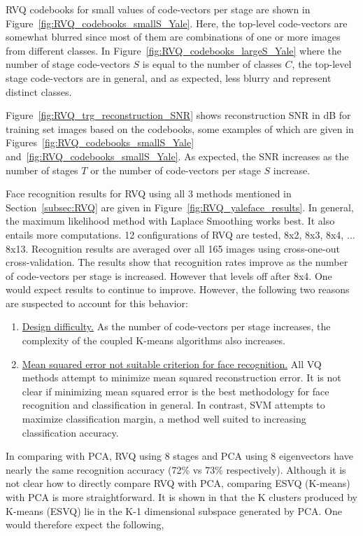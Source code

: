 RVQ codebooks for small values of code-vectors per stage are shown in Figure~\ref{fig:RVQ_codebooks_smallS_Yale}.  Here, the top-level code-vectors are somewhat blurred since most of them are combinations of one or more images from different classes.   In Figure~\ref{fig:RVQ_codebooks_largeS_Yale} where the number of stage code-vectors $S$ is equal to the number of classes $C$, the top-level stage code-vectors are in general, and as expected, less blurry and represent distinct classes.

Figure~\ref{fig:RVQ_trg_reconstruction_SNR} shows reconstruction SNR in dB for training set images based on the codebooks, some examples of which are given in Figures~\ref{fig:RVQ_codebooks_smallS_Yale} and~\ref{fig:RVQ_codebooks_smallS_Yale}.  As expected, the SNR increases as the number of stages $T$ or the number of code-vectors per stage $S$ increase.

Face recognition results for RVQ using all 3 methods mentioned in Section~\ref{subsec:RVQ} are given in Figure~\ref{fig:RVQ_yaleface_results}.  In general, the maximum likelihood method with Laplace Smoothing works best.  It also entails more computations.  12 configurations of RVQ are tested, 8x2, 8x3, 8x4, $\ldots$ 8x13.  Recognition results are averaged over all 165 images using cross-one-out cross-validation.  The results show that recognition rates improve as the number of code-vectors per stage is increased.  However that levels off after 8x4.  One would expect results to continue to improve.  However, the following two reasons are suspected to account for this behavior:

\begin{enumerate}
\item \underline{Design difficulty.}  As the number of code-vectors per stage increases, the complexity of the coupled K-means algorithms also increases.
\item \underline{Mean squared error not suitable criterion for face recognition.}  All VQ methods attempt to minimize mean squared reconstruction error.  It is not clear if minimizing mean squared error is the best methodology for face recognition and classification in general.  In contrast, SVM attempts to maximize classification margin, a method well suited to increasing classification accuracy.
\end{enumerate}

In comparing with PCA, RVQ using 8 stages and PCA using 8 eigenvectors have nearly the same recognition accuracy (72\% vs 73\% respectively).  Although it is not clear how to directly compare RVQ with PCA, comparing ESVQ (K-means) with PCA is more straightforward.  It is shown in \cite{2004_CNF_KmeansVsPCA_DingHe} that the K clusters produced by K-means (ESVQ) lie in the K-1 dimensional subspace generated by PCA.  One would therefore expect the following,

